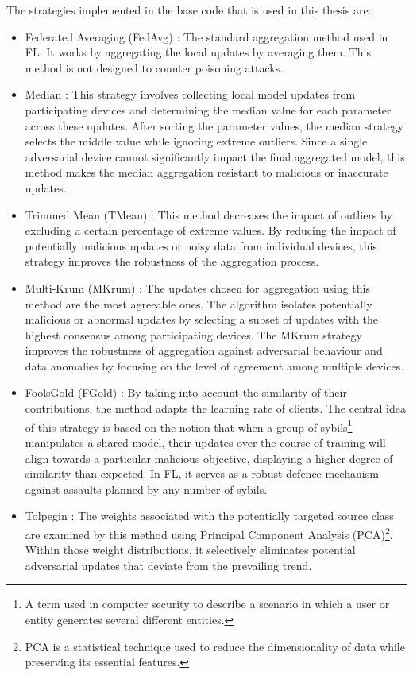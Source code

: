 The strategies implemented in the base code that is used in this thesis \cite{LFighter_code} are:
\begin{itemize} \label{sec:aggregation_methods}
        \item Federated Averaging (FedAvg) \cite{FederatedLearningPaper}: The standard aggregation method used in FL. It works by aggregating the local updates by averaging them. This method is not designed to counter poisoning attacks.
        \item Median \cite{MedianPaper}: This strategy involves collecting local model updates from participating devices and determining the median value for each parameter across these updates. After sorting the parameter values, the median strategy selects the middle value while ignoring extreme outliers. Since a single adversarial device cannot significantly impact the final aggregated model, this method makes the median aggregation resistant to malicious or inaccurate updates.
        \item Trimmed Mean (TMean) \cite{MedianPaper}: This method decreases the impact of outliers by excluding a certain percentage of extreme values. By reducing the impact of potentially malicious updates or noisy data from individual devices, this strategy improves the robustness of the aggregation process.
        \item Multi-Krum (MKrum) \cite{MKrumPaper}: The updates chosen for aggregation using this method are the most agreeable ones. The algorithm isolates potentially malicious or abnormal updates by selecting a subset of updates with the highest consensus among participating devices. The MKrum strategy improves the robustness of aggregation against adversarial behaviour and data anomalies by focusing on the level of agreement among multiple devices.
        \item FoolsGold (FGold) \cite{FoolsGoldPaper}: By taking into account the similarity of their contributions, the method adapts the learning rate of clients. The central idea of this strategy is based on the notion that when a group of sybils\footnote{A term used in computer security to describe a scenario in which a user or entity generates several different entities.} manipulates a shared model, their updates over the course of training will align towards a particular malicious objective, displaying a higher degree of similarity than expected. In FL, it serves as a robust defence mechanism against assaults planned by any number of sybils.
        \item Tolpegin \cite{TolpeginPaper}: The weights associated with the potentially targeted source class are examined by this method using Principal Component Analysis (PCA)\footnote{PCA  is a statistical technique used to reduce the dimensionality of data while preserving its essential features.}. Within those weight distributions, it selectively eliminates potential adversarial updates that deviate from the prevailing trend.

\end{itemize}

